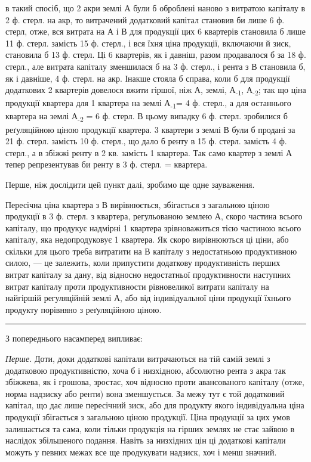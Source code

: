 \parcont{}  %
в такий спосіб, що 2 акри землі А були б оброблені наново з витратою капіталу
в 2 ф. стерл. на акр, то витрачений додатковий капітал становив би
лише 6 ф. стерл, отже, вся витрата на А і В для продукції цих 6 квартерів
становила б лише 11 ф. стерл. замість 15 ф. стерл., і вся їхня ціна
продукції, включаючи й зиск, становила б 13 ф. стерл. Ці 6 квартерів, як
і давніш, разом продавалося б за 18 ф. стерл., але витрата капіталу зменшилася
б на 3 ф. стерл., і рента з В становила б, як і давніше, 4 ф. стерл.
на акр. Інакше стояла б справа, коли б для продукції додаткових 2 квартерів
довелося вжити гіршої, ніж А, землі, А\textsubscript{-1}, А\textsubscript{-2}; так що ціна продукції
квартера для 1 квартера на землі А\textsubscript{-1}= 4 ф. стерл., а для останнього
квартера на землі А\textsubscript{-2} = 6 ф. стерл. В цьому випадку 6 ф. стерл.
зробилися б реґуляційною ціною продукції квартера. 3 квартери з землі В
були б продані за 21 ф. стерл. замість 10 ф. стерл., що дало б ренту в 15 ф.
стерл. замість 4 ф. стерл., а в збіжжі ренту в 2 кв. замість 1 квартера.
Так само квартер з землі А тепер репрезентував би ренту в 3 ф. стерл. =
 квартера.

Перше, ніж дослідити цей пункт далі, зробимо ще одне зауваження.

Пересічна ціна квартера з В вирівнюється, збігається з загальною ціною
продукції в 3 ф. стерл. з квартера, регульованою землею А, скоро частина
всього капіталу, що продукує надмірні 1 квартера зрівноважиться тією частиною
всього капіталу, яка недопродуковує 1 квартера. Як скоро вирівнюються
ці ціни, або скільки для цього треба витратити на В капіталу з недостатньою
продуктивною силою, — це залежить, коли припустити додаткову
продуктивність перших витрат капіталу за дану, від відносно недостатньої продуктивности
наступних витрат капіталу проти продуктивности рівновеликої витрати
капіталу на найгіршій регуляційній землі А, або від індивідуальної ціни
продукції їхнього продукту порівняно з реґуляційною ціною.

\pfbreak

З попереднього насамперед випливає:

\emph{Перше.} Доти, доки додаткові капітали витрачаються на тій самій землі
з додатковою продуктивністю, хоча б і низхідною, абсолютно рента з акра
так збіжжева, як і грошова, зростає, хоч відносно проти авансованого капіталу
(отже, норма надзиску або ренти) вона зменшується. За межу тут є той додатковий
капітал, що дає лише пересічний зиск, або для продукту якого індивідуальна
ціна продукції збігається з загальною ціною продукції. Ціна продукції
за цих умов залишається та сама, коли тільки продукція на гірших землях
не стає зайвою в наслідок збільшеного подання. Навіть за низхідних цін ці
додаткові капітали можуть у певних межах все ще продукувати надзиск, хоч
і менш значний.

